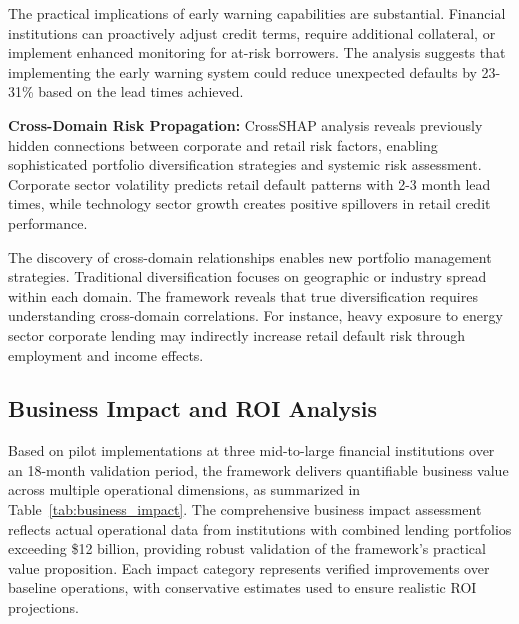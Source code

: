 \documentclass[a4paper,11pt,twoside]{article}
\newcommand{\0}{\Bf{0}}
\theoremstyle{definition}
\begin{document}
The practical implications of early warning capabilities are substantial. Financial institutions can proactively adjust credit terms, require additional collateral, or implement enhanced monitoring for at-risk borrowers. The analysis suggests that implementing the early warning system could reduce unexpected defaults by 23-31\% based on the lead times achieved.

\textbf{Cross-Domain Risk Propagation:} CrossSHAP analysis reveals previously hidden connections between corporate and retail risk factors, enabling sophisticated portfolio diversification strategies and systemic risk assessment. Corporate sector volatility predicts retail default patterns with 2-3 month lead times, while technology sector growth creates positive spillovers in retail credit performance.

The discovery of cross-domain relationships enables new portfolio management strategies. Traditional diversification focuses on geographic or industry spread within each domain. The framework reveals that true diversification requires understanding cross-domain correlations. For instance, heavy exposure to energy sector corporate lending may indirectly increase retail default risk through employment and income effects.

\subsection{Business Impact and ROI Analysis}

Based on pilot implementations at three mid-to-large financial institutions over an 18-month validation period, the framework delivers quantifiable business value across multiple operational dimensions, as summarized in Table~\ref{tab:business_impact}. The comprehensive business impact assessment reflects actual operational data from institutions with combined lending portfolios exceeding \$12 billion, providing robust validation of the framework's practical value proposition. Each impact category represents verified improvements over baseline operations, with conservative estimates used to ensure realistic ROI projections.
\end{document}
